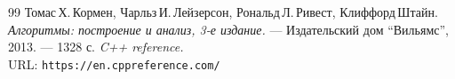 \begin{thebibliography}{99}
Томас\,Х.\,Кормен, Чарльз\,И.\,Лейзерсон, Рональд\,Л.\,Ривест, Клиффорд\,Штайн.
{\itshape Алгоритмы: построение и анализ, 3-е издание.} --- Издательский дом \enquote{Вильямс}, 2013. --- 1328 с.
{\itshape C++ reference.} \\URL: \texttt{https://en.cppreference.com/} 
\end{thebibliography}
\pagebreak
